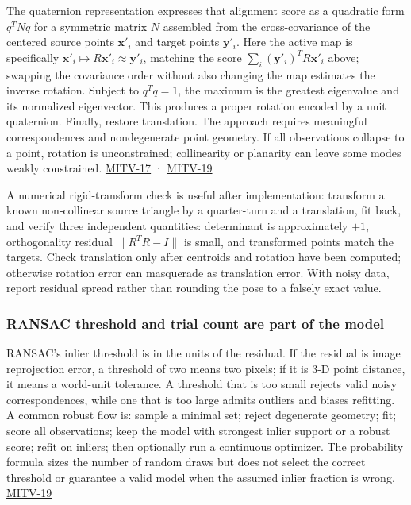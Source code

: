 The quaternion representation expresses that alignment score as a quadratic form \(q^TNq\) for a symmetric matrix \(N\) assembled from the cross-covariance of the centered source points \(\mathbf x'_i\) and target points \(\mathbf y'_i\). Here the active map is specifically \(\mathbf x'_i\mapsto R\mathbf x'_i\approx\mathbf y'_i\), matching the score \(\sum_i(\mathbf y'_i)^TR\mathbf x'_i\) above; swapping the covariance order without also changing the map estimates the inverse rotation. Subject to \(q^Tq=1\), the maximum is the greatest eigenvalue and its normalized eigenvector. This produces a proper rotation encoded by a unit quaternion. Finally, restore translation. The approach requires meaningful correspondences and nondegenerate point geometry. If all observations collapse to a point, rotation is unconstrained; collinearity or planarity can leave some modes weakly constrained. \hyperref[04-visual-computing-ii-ch036]{MITV-17} · \hyperref[04-visual-computing-ii-ch036]{MITV-19}

A numerical rigid-transform check is useful after implementation: transform a known non-collinear source triangle by a quarter-turn and a translation, fit back, and verify three independent quantities: determinant is approximately \(+1\), orthogonality residual \(\|R^TR-I\|\) is small, and transformed points match the targets. Check translation only after centroids and rotation have been computed; otherwise rotation error can masquerade as translation error. With noisy data, report residual spread rather than rounding the pose to a falsely exact value.

\subsubsection{RANSAC threshold and trial count are part of the model}\label{ransac-threshold-and-trial-count-are-part-of-the-model}

RANSAC's inlier threshold is in the units of the residual. If the residual is image reprojection error, a threshold of two means two pixels; if it is 3-D point distance, it means a world-unit tolerance. A threshold that is too small rejects valid noisy correspondences, while one that is too large admits outliers and biases refitting. A common robust flow is: sample a minimal set; reject degenerate geometry; fit; score all observations; keep the model with strongest inlier support or a robust score; refit on inliers; then optionally run a continuous optimizer. The probability formula sizes the number of random draws but does not select the correct threshold or guarantee a valid model when the assumed inlier fraction is wrong. \hyperref[04-visual-computing-ii-ch036]{MITV-19}

